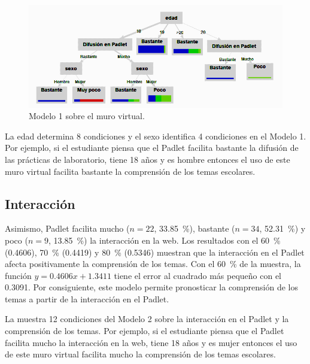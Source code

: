 \documentclass[spanish]{textolivre}
\begin{document}
\begin{figure}[h]
\centering
\begin{minipage}{.85\textwidth}
    \includegraphics[width=\linewidth]{Fig3.png}
    \caption{Modelo 1 sobre el muro virtual.}
    \label{fig3}
\end{minipage}
\end{figure}

La edad determina 8 condiciones y el sexo identifica 4 condiciones en el Modelo 1. Por ejemplo, si el estudiante piensa que el Padlet facilita bastante la difusión de las prácticas de laboratorio, tiene 18 años y es hombre entonces el uso de este muro virtual facilita bastante la comprensión de los temas escolares.

\subsection{Interacción}\label{sec-autores}
Asimismo, Padlet facilita mucho ($n = 22$, 33.85~\%), bastante ($n = 34$, 52.31~\%) y poco ($n = 9$, 13.85~\%) la interacción en la web. Los resultados con el 60~\% (0.4606), 70~\% (0.4419) y 80~\% (0.5346) muestran que la interacción en el Padlet afecta positivamente la comprensión de los temas. Con el 60~\% de la muestra, la función $y = 0.4606x + 1.3411$ tiene el error al cuadrado más pequeño con el 0.3091. Por consiguiente, este modelo permite pronosticar la comprensión de los temas a partir de la interacción en el Padlet.

La  muestra 12 condiciones del Modelo 2 sobre la interacción en el Padlet y la comprensión de los temas. Por ejemplo, si el estudiante piensa que el Padlet facilita mucho la interacción en la web, tiene 18 años y es mujer entonces el uso de este muro virtual facilita mucho la comprensión de los temas escolares.
\end{document}
